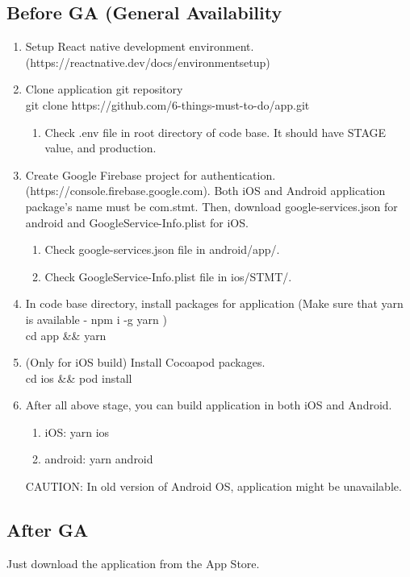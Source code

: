\documentclass[conference]{IEEEtran}
\begin{document}
\subsection{Before GA (General Availability} 
\begin{enumerate}

    \item Setup React native development environment. (https://reactnative.dev/docs/environmentsetup)
    \item Clone application git repository \\
    git clone https://github.com/6-things-must-to-do/app.git
    \begin{enumerate}
        \item Check .env file in root directory of code base. It should have STAGE value, and production.
    \end{enumerate}
    \item Create Google Firebase project for authentication. (https://console.firebase.google.com). Both iOS and Android application package's name must be com.stmt. Then, download google-services.json for android and GoogleService-Info.plist for iOS.
    \begin{enumerate}
        \item Check google-services.json file in android/app/.
        \item Check GoogleService-Info.plist file in ios/STMT/.
    \end{enumerate}
    \item In code base directory, install packages for application (Make sure that yarn is available - npm i -g yarn ) \\
    cd app \&\& yarn
    \item (Only for iOS build) Install Cocoapod packages. \\
    cd ios \&\& pod install
    \item After all above stage, you can build application in both iOS and Android.
    \begin{enumerate}
        \item iOS: yarn ios
        \item android: yarn android
    \end{enumerate}
    CAUTION: In old version of Android OS, application might be unavailable.
\end{enumerate}

\subsection{After GA}
Just download the application from the App Store.
\end{document}
